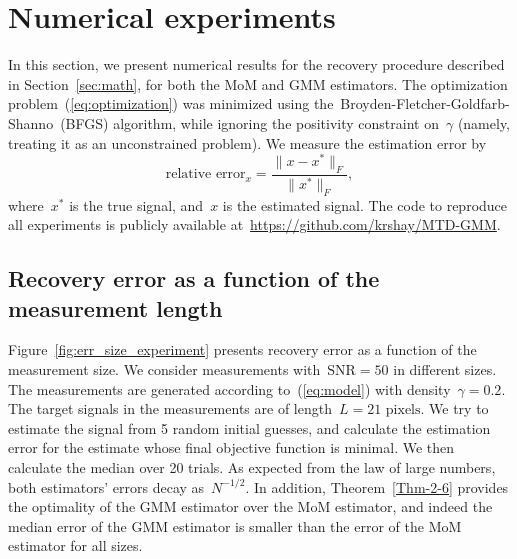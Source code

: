 \documentclass{article}
\begin{document}
\section{Numerical experiments}
\label{sec:numerical}
In this section, we present numerical results for the recovery procedure described in Section~\ref{sec:math}, for both the MoM and GMM estimators. The optimization problem~(\ref{eq:optimization}) was minimized using the~\mbox{Broyden-Fletcher-Goldfarb-Shanno}~(BFGS) algorithm, while ignoring the positivity constraint on~$\gamma$ (namely, treating it as an unconstrained problem).  We measure the estimation error by
\begin{equation}
\text{relative error}_x = \frac{\|x - x^*\|_F}{\|x^*\|_F},
\end{equation}
where~$x^*$ is the true signal, and~$x$ is the estimated signal. The code to reproduce all experiments is publicly available at~\url{https://github.com/krshay/MTD-GMM}.


\subsection{Recovery error as a function of the measurement length}
\label{subsec:exp_size}
Figure~\ref{fig:err_size_experiment} presents recovery error as a function of the measurement size. We consider measurements with~\mbox{$\text{SNR} = 50$} in different sizes. The measurements are generated according to~(\ref{eq:model}) with density~$\gamma = 0.2$. The target signals in the measurements are of length~\mbox{$L = 21 \text{ pixels}$}. We try to estimate the signal from 5 random initial guesses, and calculate the estimation error for the estimate whose final objective function is minimal. We then calculate the median over 20 trials. As expected from the law of large numbers, both estimators' errors  decay as~$N^{-1/2}$. In addition, Theorem~\ref{Thm-2-6} provides the optimality of the GMM estimator over the MoM estimator, and indeed the median error of the GMM estimator is smaller than the error of the MoM estimator for all sizes.
\end{document}
